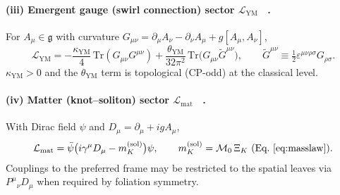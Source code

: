 \documentclass[10pt,reprint,aps,onecolumn,nofootinbib]{revtex4-2}
\begin{document}
    \paragraph*{(iii) Emergent gauge (swirl connection) sector \(\mathcal{L}_{\mathrm{YM}}\)~ \cite{sstCanon,4}.}
        For \(A_\mu\in\mathfrak{g}\) with curvature
        \(G_{\mu\nu}=\partial_\mu A_\nu-\partial_\nu A_\mu+g[A_\mu,A_\nu]\),
        \begin{equation}
        \mathcal{L}_{\mathrm{YM}}
        =-\frac{\kappa_{\mathrm{YM}}}{4}\,\mathrm{Tr}(G_{\mu\nu}G^{\mu\nu})
        +\frac{\theta_{\mathrm{YM}}}{32\pi^2}\,
        \mathrm{Tr}\!\big(G_{\mu\nu}\tilde G^{\mu\nu}\big),
        \qquad
        \tilde G^{\mu\nu}\equiv\tfrac12\varepsilon^{\mu\nu\rho\sigma}G_{\rho\sigma}.
        \label{eq:LYM_app}
        \end{equation}
        \(\kappa_{\mathrm{YM}}>0\) and the \(\theta_{\mathrm{YM}}\) term is topological (CP-odd) at the classical level.

    \paragraph*{(iv) Matter (knot–soliton) sector \(\mathcal{L}_{\mathrm{mat}}\)~ \cite{sstLagrangian}.}
        With Dirac field \(\psi\) and \(D_\mu=\partial_\mu+i g A_\mu\),
        \begin{equation}
        \mathcal{L}_{\mathrm{mat}}
        =\bar\psi\big(i\gamma^\mu D_\mu-m_K^{(\mathrm{sol})}\big)\psi,
        \qquad
        m_K^{(\mathrm{sol})}=\mathcal{M}_0\,\Xi_K
        \ \text{(Eq.~\ref{eq:masslaw})}.
        \label{eq:Lmat_app}
        \end{equation}
        Couplings to the preferred frame may be restricted to the spatial leaves via \(P^\mu{}_\nu D_\mu\) when required by foliation symmetry.
\end{document}
